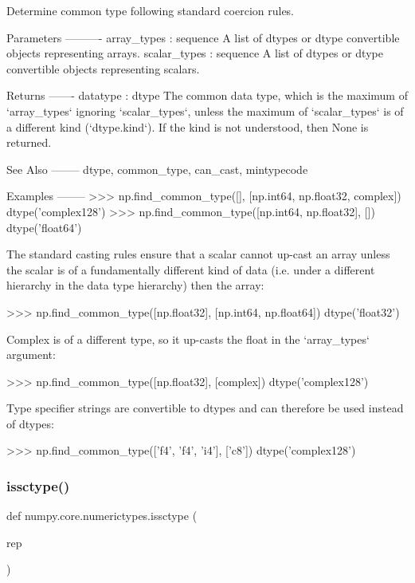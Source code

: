 \begin{DoxyVerb}Determine common type following standard coercion rules.

Parameters
----------
array_types : sequence
    A list of dtypes or dtype convertible objects representing arrays.
scalar_types : sequence
    A list of dtypes or dtype convertible objects representing scalars.

Returns
-------
datatype : dtype
    The common data type, which is the maximum of `array_types` ignoring
    `scalar_types`, unless the maximum of `scalar_types` is of a
    different kind (`dtype.kind`). If the kind is not understood, then
    None is returned.

See Also
--------
dtype, common_type, can_cast, mintypecode

Examples
--------
>>> np.find_common_type([], [np.int64, np.float32, complex])
dtype('complex128')
>>> np.find_common_type([np.int64, np.float32], [])
dtype('float64')

The standard casting rules ensure that a scalar cannot up-cast an
array unless the scalar is of a fundamentally different kind of data
(i.e. under a different hierarchy in the data type hierarchy) then
the array:

>>> np.find_common_type([np.float32], [np.int64, np.float64])
dtype('float32')

Complex is of a different type, so it up-casts the float in the
`array_types` argument:

>>> np.find_common_type([np.float32], [complex])
dtype('complex128')

Type specifier strings are convertible to dtypes and can therefore
be used instead of dtypes:

>>> np.find_common_type(['f4', 'f4', 'i4'], ['c8'])
dtype('complex128')\end{DoxyVerb}
 \mbox{\label{namespacenumpy_1_1core_1_1numerictypes_ac0d06f07b4d9348f62cd776c5a4dfed1}} 
\subsubsection{\texorpdfstring{issctype()}{issctype()}}
{\footnotesize\ttfamily def numpy.\+core.\+numerictypes.\+issctype (\begin{DoxyParamCaption}\item[{}]{rep }\end{DoxyParamCaption})}

